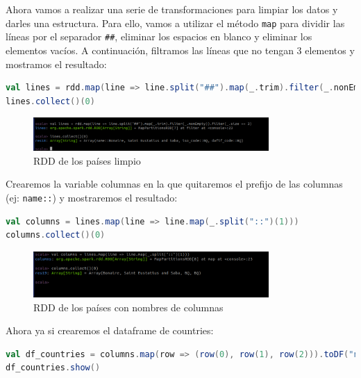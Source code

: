 Ahora vamos a realizar una serie de transformaciones para limpiar los datos y darles una estructura. Para ello, vamos a utilizar el método \texttt{map} para dividir las líneas por el separador \texttt{##}, eliminar los espacios en blanco y eliminar los elementos vacíos. A continuación, filtramos las líneas que no tengan 3 elementos y mostramos el resultado:

\begin{lstlisting}[language=scala]
val lines = rdd.map(line => line.split("##").map(_.trim).filter(_.nonEmpty)).filter(_.size == 3)
lines.collect()(0)
\end{lstlisting}

\begin{figure}[H]
    \centering
    \includegraphics[width=0.8\textwidth]{figures/26.png}
    \caption{RDD de los países limpio}
    \label{fig:countries_rdd_clean}
\end{figure}

Crearemos la variable columnas en la que quitaremos el prefijo de las columnas (ej: \texttt{name::}) y mostraremos el resultado:

\begin{lstlisting}[language=scala]
val columns = lines.map(line => line.map(_.split("::")(1)))
columns.collect()(0)
\end{lstlisting}

\begin{figure}[H]
    \centering
    \includegraphics[width=0.8\textwidth]{figures/27.png}
    \caption{RDD de los países con nombres de columnas}
    \label{fig:countries_rdd_columns}
\end{figure}

Ahora ya si crearemos el dataframe de countries:

\begin{lstlisting}[language=scala]
val df_countries = columns.map(row => (row(0), row(1), row(2))).toDF("name", "iso_code", "dafif_code")
df_countries.show()
\end{lstlisting}

